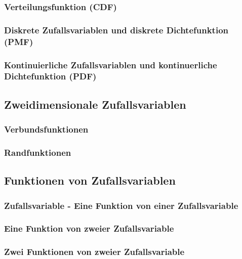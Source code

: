 \subsubsection{Verteilungsfunktion (CDF) }
\subsubsection{Diskrete Zufallsvariablen und diskrete Dichtefunktion (PMF) }
\subsubsection{Kontinuierliche Zufallsvariablen und kontinuerliche Dichtefunktion
(PDF) }
\vspace{0.25cm}

\subsection{Zweidimensionale Zufallsvariablen }
\subsubsection{Verbundsfunktionen }
\subsubsection{Randfunktionen }
\vspace{0.25cm}

\subsection{Funktionen von Zufallsvariablen }
\subsubsection{Zufallsvariable - Eine Funktion von einer Zufallsvariable}
\subsubsection{Eine Funktion von zweier Zufallsvariable }
\subsubsection{Zwei Funktionen von zweier Zufallsvariable }
\vspace{0.25cm}

